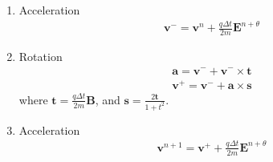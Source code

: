 \documentclass[a4paper, 11pt]{article}
\begin{document}
\begin{enumerate}
    \item Acceleration 
\begin{eqnarray}
    \mathbf{v}^- = \mathbf{v}^{n} + \frac{q\Delta t}{2m}\mathbf{E}^{n+\theta}
\end{eqnarray}

    \item Rotation
\begin{eqnarray} 
    \mathbf{a} = \mathbf{v}^- + \mathbf{v}^- \times \mathbf{t} \\
    \mathbf{v}^+ = \mathbf{v}^- + \mathbf{a} \times \mathbf{s}
\end{eqnarray}
    where $\mathbf{t} = \frac{q\Delta t}{2m} \mathbf{B}$, and $\mathbf{s} = \frac{2\mathbf{t}}{1+t^2}$.

    \item  Acceleration
\begin{eqnarray}    
    \mathbf{v}^{n+1} = \mathbf{v}^+ + \frac{q\Delta t}{2m}\mathbf{E}^{n+\theta}
\end{eqnarray}
\end{enumerate}
\end{document}

